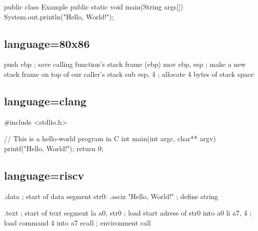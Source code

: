 \documentclass[
    narrow,
    fontstyle=light,
    babelparam=ngerman
]{elite}
\begin{document}
\begincode
\begin{CodeListing}[language=java, caption=Beispiel-Code]
public class Example {
    public static void main(String args[]) {
        System.out.println("Hello, World!");
    }
}
\end{CodeListing}
\endcode

\subsection{language=80x86}

\begincode
\begin{CodeListing}[language=80x86, title=Intel 80x86 Assembler Beispiel]
push    ebp       ; save calling function's stack frame (ebp)
mov     ebp, esp  ; make a new stack frame on top of our caller's stack
sub     esp, 4    ; allocate 4 bytes of stack space
\end{CodeListing}
\endcode

\subsection{language=clang}

\begincode
\begin{CodeListing}[language=clang, title=Example C-Code]
#include <stdlio.h>

// This is a hello-world program in C
int main(int argc, char** argv)
{
    printf("Hello, World!\n");
    return 0;
}
\end{CodeListing}
\endcode

\subsection{language=riscv}

\begincode
\begin{CodeListing}[language=riscv, title=Example RISC-V Assembler]
        .data                       ; start of data segment
str0:   .asciz "Hello, World!\n"    ; define string

        .text                       ; start of text segment
        la a0, str0                 ; load start adress of str0 into a0
        li a7, 4                    ; load command 4 into a7
        ecall                       ; environment call
\end{CodeListing}
\endcode

\printindex

\lstlistoflistings
\listoffigures
\end{document}
